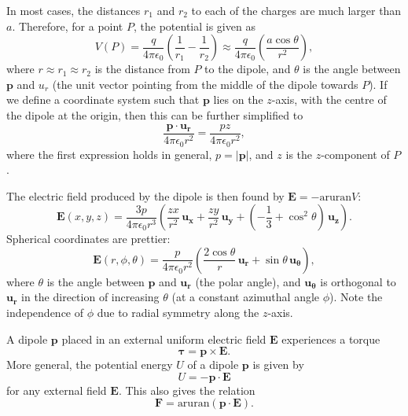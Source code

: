 \documentclass[a4paper, 12pt]{article}
\renewcommand{\vec}[1]{\mathbf{#1}}
\newcommand{\E}{\ensuremath{\vec{E}}}
\newcommand{\e}{\ensuremath{\epsilon_0}}
\renewcommand{\nabla}{\text{aruran}}
\begin{document}
    In most cases, the distances $r_1$ and $r_2$ to each of the charges are much larger than $a$. Therefore, for a point $P$, the potential is given as 
    \begin{equation}
        V(P) = \frac{q}{4\pi\e}\left( \frac{1}{r_1}-\frac{1}{r_2}\right) \approx \frac{q}{4\pi\e}\left(\frac{a\cos\theta}{r^2}\right),
    \end{equation}
    where $r \approx r_1 \approx r_2$ is the distance from $P$ to the dipole, and $\theta$ is the angle between $\vec{p}$ and $u_r$ (the unit vector pointing from the middle of the dipole towards $P$). If we define a coordinate system such that $\vec{p}$ lies on the $z$-axis, with the centre of the dipole at the origin, then this can be further simplified to
    \begin{equation}
        \frac{\vec{p}\cdot \vec{u_r}}{4\pi\e r^2} = \frac{pz}{4\pi\e r^2},
    \end{equation}
    where the first expression holds in general, $p = |\vec{p}|$, and $z$ is the $z$-component of $P$.
    
    The electric field produced by the dipole is then found by $\E = -\nabla V$:
    \begin{equation}
        \E(x, y, z) = \frac{3p}{4\pi\e r^3}\left(\frac{zx}{r^2}\,\vec{u_x} + \frac{zy}{r^2}\,\vec{u_y} + \left( -\frac{1}{3} +\cos^2\theta\right)\,\vec{u_z}\right).
    \end{equation}
    Spherical coordinates are prettier: 
    \begin{equation}
        \E(r, \phi, \theta) = \frac{p}{4\pi\e r^2}\left(\frac{2\cos\theta}{r}\,\vec{u_r} + \sin\theta \, \vec{u_\theta}\right),
    \end{equation}
    where $\theta$ is the angle between $\vec{p}$ and $\vec{u_r}$ (the polar angle), and $\vec{u_\theta}$ is orthogonal to $\vec{u_r}$ in the direction of increasing $\theta$ (at a constant azimuthal angle $\phi$). Note the independence of $\phi$ due to radial symmetry along the $z$-axis. 
    
    A dipole $\vec{p}$ placed in an external uniform electric field $\E$ experiences a torque
    \begin{equation}
        \vec{\tau} = \vec{p} \times \E.
    \end{equation}
    More general, the potential energy $U$ of a dipole $\vec{p}$ is given by
    \begin{equation}
        U = -\vec{p}\cdot \E
    \end{equation}
    for any external field $\E$. This also gives the relation 
    \begin{equation}
        \vec{F} = \nabla\left(\vec{p}\cdot\E\right).
    \end{equation}
\end{document}
